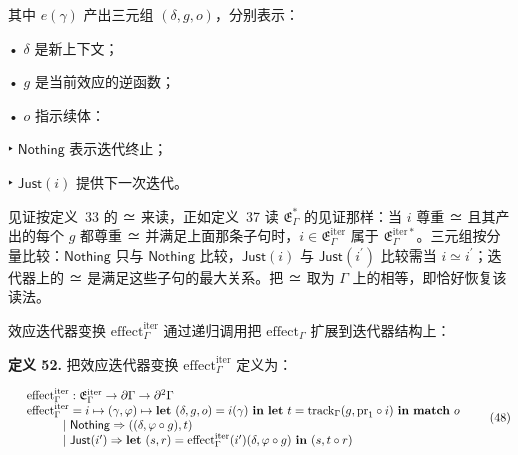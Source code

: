 其中 \(e ( \gamma )\) 产出三元组 \(( \delta , g , o )\)，分别表示：

• \(\delta\) 是新上下文；

• \(g\) 是当前效应的逆函数；

• \(o\) 指示续体：

‣ \(\mathsf { N o t h i n g }\) 表示迭代终止；

‣ \(\mathsf { J u s t } ( i )\) 提供下一次迭代。

见证按定义~33 的 ≃ 来读，正如定义~37 读 \(\mathfrak { E } _ { \Gamma } ^ { * }\) 的见证那样：当 \(i\) 尊重 ≃ 且其产出的每个 \(g\) 都尊重 ≃ 并满足上面那条子句时，\(i \in \mathfrak { E } _ { \Gamma } ^ { \mathrm { i t e r } }\) 属于 \(\mathfrak { E } _ { \Gamma } ^ { \mathrm { i t e r * } }\)。三元组按分量比较：\(\mathsf { N o t h i n g }\) 只与 \(\mathsf { N o t h i n g }\) 比较，\(\mathsf { J u s t } ( i )\) 与 \(\mathsf { J u s t } ( i ^ { \prime } )\) 比较需当 \(i \simeq i ^ { \prime }\)；迭代器上的 ≃ 是满足这些子句的最大关系。把 ≃ 取为 \(\Gamma\) 上的相等，即恰好恢复该读法。

效应迭代器变换 \(\mathrm { e f f e c t } _ { \Gamma } ^ { \mathrm { i t e r } }\) 通过递归调用把 \(\mathrm { e f f e c t } _ { \Gamma }\) 扩展到迭代器结构上：

\textbf{定义 52.} 把效应迭代器变换 \(\mathrm { e f f e c t } _ { \Gamma } ^ { \mathrm { i t e r } }\) 定义为：

\[
\begin{array} { r l } & { \mathrm { e f f e c t } _ { \Gamma } ^ { \mathrm { i t e r } } : \mathfrak { E } _ { \Gamma } ^ { \mathrm { i t e r } } \to \partial \Gamma \to \partial ^ { 2 } \Gamma } \\ & { \mathrm { e f f e c t } _ { \Gamma } ^ { \mathrm { i t e r } } = i \mapsto ( \gamma , \varphi ) \mapsto \mathbf { l e t } \ ( \delta , g , o ) = i ( \gamma ) \ \mathbf { i n } \ \mathbf { l e t } \ t = \mathrm { t r a c k } _ { \Gamma } ( g , \mathrm { p r } _ { 1 } \circ i ) \ \mathbf { i n } \ \mathbf { m a t c h } \ o } \\ & { \qquad \quad | \ \mathsf { N o t h i n g } \Rightarrow ( ( \delta , \varphi \circ g ) , t ) } \\ & { \qquad \quad | \ \mathsf { J u s t } ( i ^ { \prime } ) \Rightarrow \mathbf { l e t } \ ( s , r ) = \mathrm { e f f e c t } _ { \Gamma } ^ { \mathrm { i t e r } } ( i ^ { \prime } ) ( \delta , \varphi \circ g ) \ \mathbf { i n } \ ( s , t \circ r ) } \end{array}\tag{48}
\]

